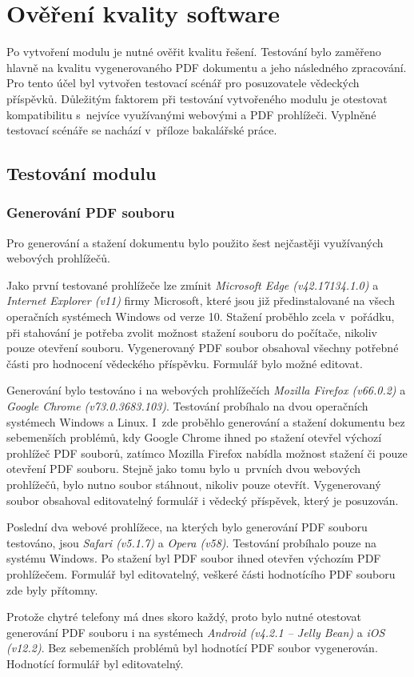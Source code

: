\chapter{Ověření kvality software}
Po vytvoření modulu je nutné ověřit kvalitu řešení. Testování bylo zaměřeno hlavně na kvalitu vygenerovaného PDF dokumentu a jeho následného zpracování. Pro tento účel byl vytvořen testovací scénář pro posuzovatele vědeckých příspěvků. Důležitým faktorem při testování vytvořeného modulu je otestovat kompatibilitu s~nejvíce využívanými webovými a PDF prohlížeči. Vyplněné testovací scénáře se nachází v~příloze bakalářské práce.

\section{Testování modulu}

\subsection{Generování PDF souboru}
Pro generování a stažení dokumentu bylo použito šest nejčastěji využívaných webových prohlížečů.
\par
Jako první testované prohlížeče lze zmínit \textit{Microsoft Edge (v42.17134.1.0)} a \textit{Internet Explorer (v11)} firmy Microsoft, které jsou již předinstalované na všech operačních systémech Windows od verze 10. Stažení proběhlo zcela v~pořádku, při stahování je potřeba zvolit možnost stažení souboru do počítače, nikoliv pouze otevření souboru. Vygenerovaný PDF soubor obsahoval všechny potřebné části pro hodnocení vědeckého příspěvku. Formulář bylo možné editovat.
\par
Generování bylo testováno i na webových prohlížečích \textit{Mozilla Firefox (v66.0.2)} a \textit{Google Chrome (v73.0.3683.103)}. Testování probíhalo na dvou operačních systémech Windows a Linux. I~zde proběhlo generování a stažení dokumentu bez sebemenších problémů, kdy Google Chrome ihned po stažení otevřel výchozí prohlížeč PDF souborů, zatímco Mozilla Firefox nabídla možnost stažení či pouze otevření PDF souboru. Stejně jako tomu bylo u~prvních dvou webových prohlížečů, bylo nutno soubor stáhnout, nikoliv pouze otevřít. Vygenerovaný soubor obsahoval editovatelný formulář i vědecký příspěvek, který je posuzován.
\par
Poslední dva webové prohlížece, na kterých bylo generování PDF souboru testováno, jsou \textit{Safari (v5.1.7)} a \textit{Opera (v58)}. Testování probíhalo pouze na systému Windows. Po stažení byl PDF soubor ihned otevřen výchozím PDF prohlížečem. Formulář byl editovatelný, veškeré části hodnotícího PDF souboru zde byly přítomny.
\par
Protože chytré telefony má dnes skoro každý, proto bylo nutné otestovat generování PDF souboru i na systémech \textit{Android (v4.2.1 -- Jelly Bean)} a \textit{iOS (v12.2)}. Bez sebemenších problémů byl hodnotící PDF soubor vygenerován. Hodnotící formulář byl editovatelný.

